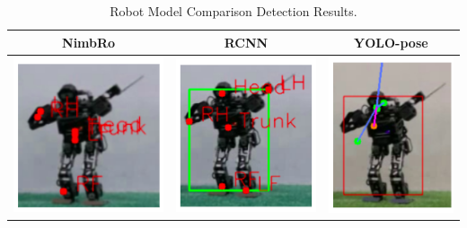 \begin{table}
\caption{Robot Model Comparison Detection Results.}
\centering
    \begin{tabular}{|c|c|c|}
    \hline
    \rowcolor{lightgray}
    \textbf{NimbRo}    & \textbf{RCNN} & \textbf{YOLO-pose}\\
    \hline
    \includegraphics[scale=0.75]{gambar/nimbro-1.png} & \includegraphics[scale=0.75]{gambar/rcnn-1.png} & \includegraphics[scale=0.75]{gambar/yolo-1.png} \\
    \hline

\end{tabular}
\end{table}
